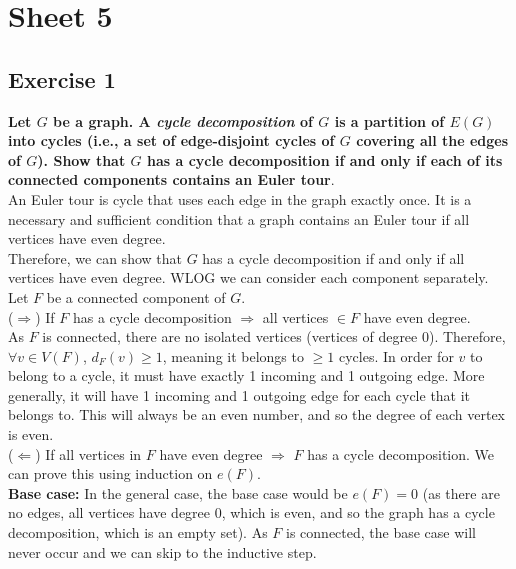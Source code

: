 \section*{Sheet 5}
\subsection*{Exercise 1}
\boldmath
\textbf{Let $G$ be a graph. A \textit{cycle decomposition} of $G$ is a partition of $E(G)$ into cycles (i.e., a set of edge-disjoint cycles of $G$ covering all the edges of $G$). Show that $G$ has a cycle decomposition if and only if each of its connected components contains an Euler tour}. \\
\unboldmath
\linebreak 
An Euler tour is cycle that uses each edge in the graph exactly once. It is a necessary and sufficient condition that a graph contains an Euler tour if all vertices have even degree. \\
\linebreak 
Therefore, we can show that $G$ has a cycle decomposition if and only if all vertices have even degree. WLOG we can consider each component separately. Let $F$ be a connected component of $G$. \\
\linebreak 
\boldmath
($\Rightarrow$) \unboldmath If $F$ has a cycle decomposition $\Rightarrow$ all vertices $\in F$ have even degree. \\
\linebreak 
As $F$ is connected, there are no isolated vertices (vertices of degree 0). Therefore, $\forall v \in V(F)$, $d_F(v) \geq 1$, meaning it belongs to $\geq 1$ cycles. In order for $v$ to belong to a cycle, it must have exactly 1 incoming and 1 outgoing edge. More generally, it will have 1 incoming and 1 outgoing edge for each cycle that it belongs to. This will always be an even number, and so the degree of each vertex is even. \\
\linebreak
\boldmath
($\Leftarrow$) \unboldmath If all vertices in $F$ have even degree $\Rightarrow$ $F$ has a cycle decomposition. We can prove this using induction on $e(F)$. \\
\linebreak 
\textbf{Base case:} In the general case, the base case would be $e(F) = 0$ (as there are no edges, all vertices have degree 0, which is even, and so the graph has a cycle decomposition, which is an empty set). As $F$ is connected, the base case will never occur and we can skip to the inductive step. \\
